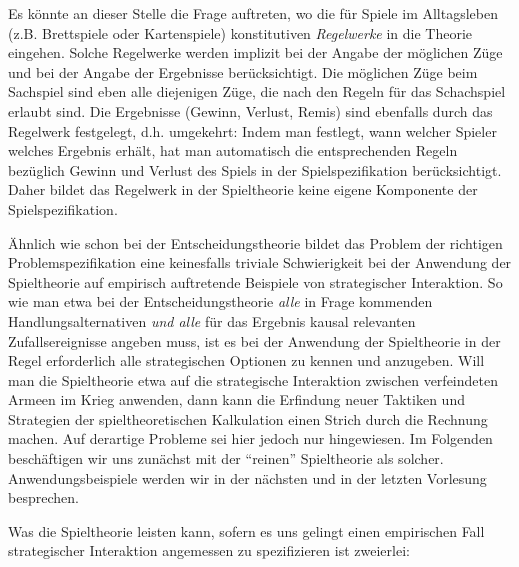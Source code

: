 Es könnte an dieser Stelle die Frage auftreten, wo die für
Spiele im Alltagsleben (z.B. Brettspiele oder Kartenspiele) konstitutiven
{\em Regelwerke} in die Theorie eingehen. Solche Regelwerke werden implizit bei
der Angabe der möglichen Züge und bei der Angabe der Ergebnisse berücksichtigt.
Die möglichen Züge beim Sachspiel sind eben alle diejenigen Züge, 
die nach den Regeln für das Schachspiel erlaubt sind. Die Ergebnisse (Gewinn,
Verlust, Remis) sind ebenfalls durch das Regelwerk festgelegt, d.h.
umgekehrt: Indem man festlegt, wann welcher Spieler welches Ergebnis erhält,
hat man automatisch die entsprechenden Regeln bezüglich Gewinn und Verlust
des Spiels in der Spielspezifikation berücksichtigt. Daher bildet das Regelwerk
in der Spieltheorie keine eigene Komponente der Spielspezifikation.

Ähnlich wie schon bei der Entscheidungstheorie bildet das Problem der richtigen
Problemspezifikation eine keinesfalls triviale Schwierigkeit bei der Anwendung
der Spieltheorie auf empirisch auftretende Beispiele von strategischer
Interaktion. So wie man etwa bei der Entscheidungstheorie {\em alle} in Frage
kommenden Handlungsalternativen {\em und alle} für das Ergebnis kausal
relevanten Zufallsereignisse angeben muss, ist es bei der Anwendung der Spieltheorie
in der Regel erforderlich alle strategischen Optionen zu kennen und anzugeben.
Will man die Spieltheorie etwa auf die strategische Interaktion zwischen
verfeindeten Armeen im Krieg anwenden, dann kann die Erfindung neuer Taktiken
und Strategien der spieltheoretischen Kalkulation einen Strich durch die
Rechnung machen. Auf derartige Probleme sei hier jedoch nur hingewiesen. Im
Folgenden beschäftigen wir uns zunächst mit der "`reinen"' Spieltheorie als
solcher. Anwendungsbeispiele werden wir in der nächsten und in der letzten
Vorlesung besprechen.

Was die Spieltheorie leisten kann, sofern es uns gelingt einen empirischen
Fall strategischer Interaktion angemessen zu spezifizieren ist zweierlei:

